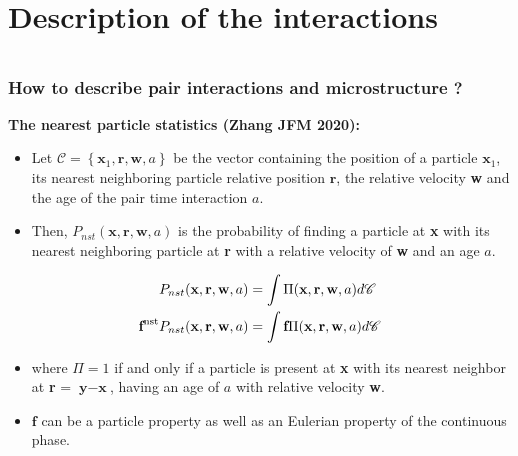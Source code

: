 \documentclass{sintefbeamer}
\begin{document}
\section{Description of the interactions}
\section*{}


\begin{frame}
  \frametitle{How to describe pair interactions and microstructure ?}
  
  \textbf{The nearest particle statistics (Zhang JFM 2020): }
  \begin{definition}
    \begin{itemize}
      \item Let $\mathscr{C} =\left\{\textbf{x}_1, \textbf{r}, \textbf{w},a\right\}$ be the vector containing the position of a particle $\textbf{x}_1$, its nearest neighboring particle relative position $\textbf{r}$, the relative velocity \textbf{w} and the age of the pair time interaction $a$.
      \item Then, $P_{nst}(\textbf{x},\textbf{r},\textbf{w},a) $ is the probability of finding a particle at \textbf{x} with its nearest neighboring particle at \textbf{r} with a relative velocity of \textbf{w} and an age $a$. 
    \end{itemize}
  \end{definition}

  \begin{align*}
    P_{nst}(\textbf{x},\textbf{r},\textbf{w},a)
    &= \int \Pi(\textbf{x},\textbf{r},\textbf{w},a) d\mathscr{C}\\
    \textbf{f}^\text{nst} P_{nst}(\textbf{x},\textbf{r},\textbf{w},a)
    &= \int \textbf{f} \Pi(\textbf{x},\textbf{r},\textbf{w},a) d\mathscr{C}
  \end{align*}
  \begin{itemize}
    \item 
    where $\Pi = 1$ if and only if a particle is present at \textbf{x} with its nearest neighbor at \textbf{r} = $\textbf{y}-\textbf{x}$, having an age of $a$ with relative velocity \textbf{w}. 
    \item $\textbf{f}$ can be a particle property as well as an Eulerian property of the continuous phase. 
  \end{itemize}
\end{frame}
\end{document}
